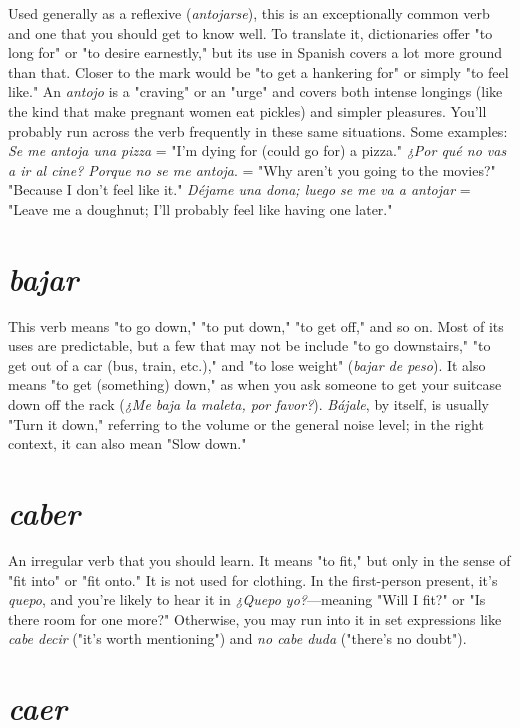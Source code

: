Used generally as a reflexive (\emph{antojarse}), this is an exceptionally common verb and one that you should get to know well. To translate it, dictionaries offer "to long for" or "to desire earnestly," but its
use in Spanish covers a lot more ground than that. Closer to the mark
would be "to get a hankering for" or simply "to feel like." An \emph{antojo}
is a "craving" or an "urge" and covers both intense longings (like the
kind that make pregnant women eat pickles) and simpler pleasures.
You'll probably run across the verb frequently in these same situations. Some examples: \emph{Se me antoja una pizza} = "I'm dying for (could
go for) a pizza." \emph{¿Por qué no vas a ir al cine? Porque no se me antoja}.
= "Why aren't you going to the movies?" "Because I don't feel like it."
\emph{Déjame una dona; luego se me va a antojar} = "Leave me a doughnut;
I'll probably feel like having one later."

\section{\emph{bajar}}

This verb means "to go down," "to put down," "to get off,"
and so on. Most of its uses are predictable, but a few that may not be
include "to go downstairs," "to get out of a car (bus, train, etc.)," and
"to lose weight" (\emph{bajar de peso}). It also means "to get (something)
down," as when you ask someone to get your suitcase down off the
rack (\emph{¿Me baja la maleta, por favor?}). \emph{Bájale}, by itself, is usually "Turn
it down," referring to the volume or the general noise level; in the
right context, it can also mean "Slow down."

\section{\emph{caber}}

An irregular verb that you should learn. It means "to fit," but
only in the sense of "fit into" or "fit onto." It is not used for clothing.
In the first-person present, it's \emph{quepo}, and you're likely to hear it in
\emph{¿Quepo yo?}---meaning "Will I fit?" or "Is there room for one more?"
Otherwise, you may run into it in set expressions like \emph{cabe decir} ("it's
worth mentioning") and \emph{no cabe duda} ("there's no doubt").

\section{\emph{caer}}

